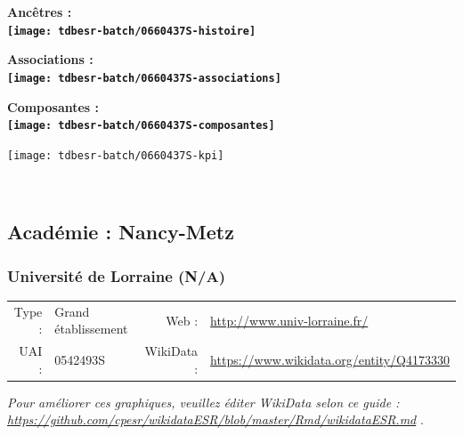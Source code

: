 \documentclass[12pt,french,]{article}
\begin{document}
\vspace{1cm}  
\begin{minipage}[b]{0.50\textwidth}\begin{center} \bf Ancêtres : \\  
\texttt{[image: tdbesr-batch/0660437S-histoire]} \end{center}\end{minipage}\begin{minipage}[b]{0.50\textwidth}\begin{center} \bf Associations : \\  
\texttt{[image: tdbesr-batch/0660437S-associations]} \end{center}\end{minipage}

\hrulefill

\begin{center} \bf Composantes : \\  
\texttt{[image: tdbesr-batch/0660437S-composantes]} \end{center}

\begin{center}\texttt{[image: tdbesr-batch/0660437S-kpi]} \end{center}\checkoddpage

\ifoddpage \fi ~\newpage  

\hypertarget{acaduxe9mie-nancy-metz}{%
\subsection{Académie : Nancy-Metz}\label{acaduxe9mie-nancy-metz}}

\hypertarget{universituxe9-de-lorraine-na}{%
\subsubsection{Université de Lorraine
(N/A)}\label{universituxe9-de-lorraine-na}}

\begin{tabular*}{\textwidth}{rp{5cm}rl}  
\hline  
Type : & Grand établissement & Web : &\href{http://www.univ-lorraine.fr/}{http://www.univ-lorraine.fr/} \\  
UAI : & 0542493S & WikiData : & \href{https://www.wikidata.org/entity/Q4173330}{https://www.wikidata.org/entity/Q4173330} \\  
\hline  
\end{tabular*}

\textit{\scriptsize Pour améliorer ces graphiques, veuillez éditer WikiData selon ce guide :  \href{https://github.com/cpesr/wikidataESR/blob/master/Rmd/wikidataESR.md}{https://github.com/cpesr/wikidataESR/blob/master/Rmd/wikidataESR.md}}
.
\end{document}
